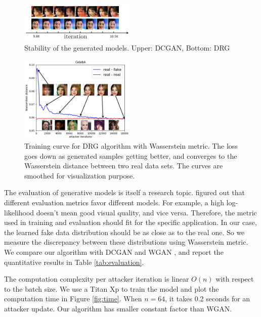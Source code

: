 \documentclass{article}
\begin{document}
\begin{figure}[htb]
\centering
\includegraphics[width=0.49\textwidth]{FIGDRG/defect}
\caption{Stability of the generated models. Upper: DCGAN, Bottom: DRG }
\label{fig:defect}
\end{figure}

\begin{figure}[htb]
\centering
\includegraphics[width=0.488\textwidth]{FIGDRG/wloss}
\caption{Training curve for DRG algorithm with Wasserstein metric. The loss goes down as generated samples getting better, and converges to the Wasserstein distance between two real data sets. The curves are smoothed for visualization purpose. }
\label{fig:curve}
\end{figure}

The evaluation of generative models is itself a research topic. \cite{DBLP:journals/corr/TheisOB15} figured out that different evaluation metrics favor different models. For example, a high log-likelihood doesn't mean good visual quality, and vice versa. Therefore, the metric used in training and evaluation should fit for the specific application. In our case, the learned fake data distribution should be as close as to the real one. So we measure the discrepancy between these distributions using Wasserstein metric. We compare our algorithm with DCGAN \cite{DBLP:journals/corr/RadfordMC15} and WGAN \cite{DBLP:journals/corr/ArjovskyCB17}, and report the quantitative results in Table \ref{tab:evaluation}.

The computation complexity per attacker iteration is linear $O(n)$ with respect to the batch size. We use a Titan Xp to train the model and plot the computation time in Figure \ref{fig:time}. When $n = 64$, it takes 0.2 seconds for an attacker update. Our algorithm has smaller constant factor than WGAN.
\end{document}
